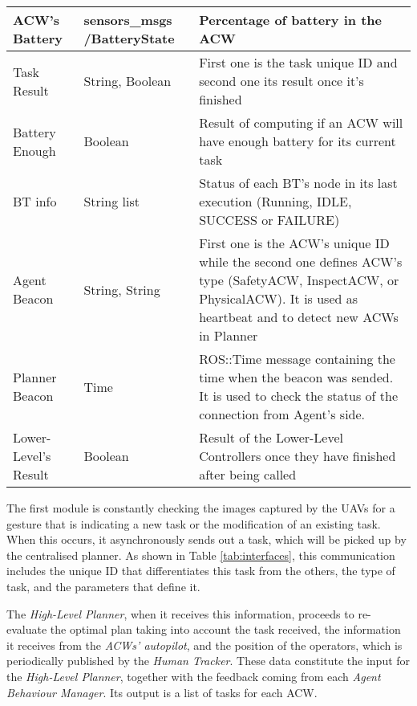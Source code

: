 \begin{table}[htb]
\begin{tabular}{|p{}|p{}|p{}|}
      \gls{ACW}'s Battery & sensors\_msgs /BatteryState & Percentage of battery in the \gls{ACW} \\ \hline

	  Task Result & String, Boolean & First one is the task unique \gls{ID} and second one its result once it's finished \\ \hline
      
      Battery Enough & Boolean & Result of computing if an \gls{ACW} will have enough battery for its current task \\ \hline

	  \gls{BT} info & String list & Status of each \gls{BT}'s node in its last execution (Running, IDLE, SUCCESS or FAILURE) \\ \hline
      
      Agent Beacon & String, String & First one is the \gls{ACW}'s unique ID while the second one defines \gls{ACW}'s type (SafetyACW, InspectACW, or PhysicalACW). It is used as heartbeat and to detect new \glspl{ACW} in Planner \\ \hline

	  Planner Beacon & Time & ROS::Time message containing the time when the beacon was sended. It is used to check the status of the connection from Agent's side. \\ \hline
      
      Lower-Level's Result & Boolean & Result of the Lower-Level Controllers once they have finished after being called \\ \hline
      
    \end{tabular}
\end{table}

The first module is constantly checking the images captured by the \glspl{UAV} for a gesture that is indicating a new task or the modification of an existing task. When this occurs, it asynchronously sends out a task, which will be picked up by the centralised planner. As shown in Table \ref{tab:interfaces}, this communication includes the unique \gls{ID} that differentiates this task from the others, the type of task, and the parameters that define it.

The \emph{High-Level Planner}, when it receives this information, proceeds to re-evaluate the optimal plan taking into account the task received, the information it receives from the \emph{\glspl{ACW}' autopilot}, and the position of the operators, which is periodically published by the \emph{Human Tracker}. These data constitute the input for the \emph{High-Level Planner}, together with the feedback coming from each \emph{Agent Behaviour Manager}. Its output is a list of tasks for each \gls{ACW}.


